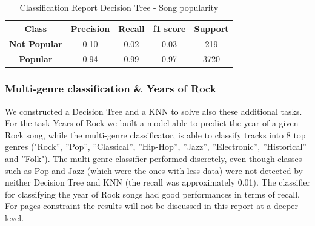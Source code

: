 \begin{table}[h]
\centering
\begin{tabular}{ccccc}
\hline
\textbf{Class}       & \textbf{Precision} & \textbf{Recall} & \textbf{f1 score} & \textbf{Support} \\ \hline
\textbf{Not Popular} & 0.10               & 0.02            & 0.03              & 219              \\ \hline
\textbf{Popular}     & 0.94               & 0.99            & 0.97              & 3720             \\ \hline
\end{tabular}
\caption{Classification Report Decision Tree - Song popularity}
\label{Classification Report Decision Tree}
\end{table}

\subsubsection{Multi-genre classification \& Years of Rock}
We constructed a Decision Tree and a KNN to solve also these additional tasks. For the task Years of Rock we built a model able to predict the year of a given Rock song, while the multi-genre classificator, is able to classify tracks into 8 top genres ("Rock”, ”Pop”, ”Classical”, ”Hip-Hop”, ”Jazz”, ”Electronic”, ”Historical” and ”Folk"). The multi-genre classifier performed discretely, even though classes such as Pop and Jazz (which were the ones with less data) were not detected by neither Decision Tree and KNN (the recall was approximately 0.01). The classifier for classifying the year of Rock songs had good performances in terms of recall. For pages constraint the results will not be discussed in this report at a deeper level. 

